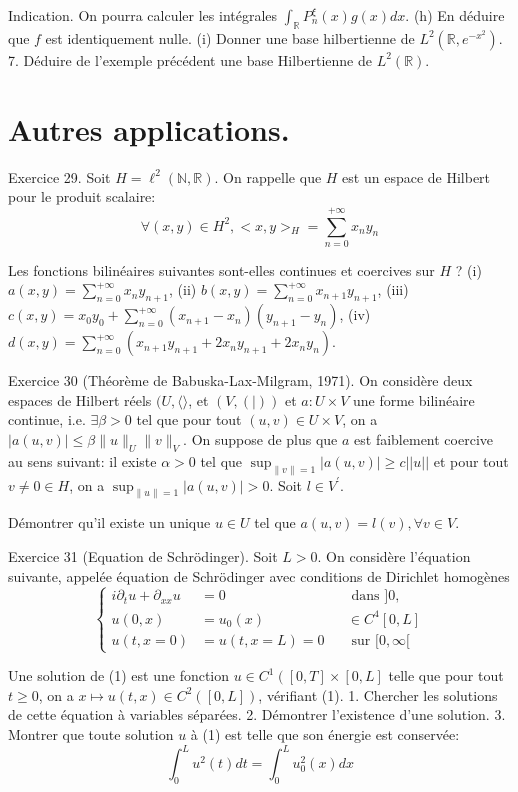 \documentclass[12pt,a4paper]{article}
\begin{document}
Indication. On pourra calculer les intégrales \(\int_{\mathbb{R}} P_{n}^{\xi}(x) g(x) d x\).
(h) En déduire que \(f\) est identiquement nulle.
(i) Donner une base hilbertienne de \(L^{2}\left(\mathbb{R}, e^{-x^{2}}\right)\).
7. Déduire de l'exemple précédent une base Hilbertienne de \(L^{2}(\mathbb{R})\).

\section*{Autres applications.}

Exercice 29. Soit \(H=\ell^{2}(\mathbb{N}, \mathbb{R})\). On rappelle que \(H\) est un espace de Hilbert pour le produit scalaire:
\[
\forall(x, y) \in H^{2},<x, y>_{H}=\sum_{n=0}^{+\infty} x_{n} y_{n}
\]

Les fonctions bilinéaires suivantes sont-elles continues et coercives sur \(H\) ?
(i) \(a(x, y)=\sum_{n=0}^{+\infty} x_{n} y_{n+1}\), (ii) \(b(x, y)=\sum_{n=0}^{+\infty} x_{n+1} y_{n+1}\),
(iii) \(c(x, y)=x_{0} y_{0}+\sum_{n=0}^{+\infty}\left(x_{n+1}-x_{n}\right)\left(y_{n+1}-y_{n}\right)\), (iv) \(d(x, y)=\sum_{n=0}^{+\infty}\left(x_{n+1} y_{n+1}+2 x_{n} y_{n+1}+2 x_{n} y_{n}\right)\).

Exercice 30 (Théorème de Babuska-Lax-Milgram, 1971). On considère deux espaces de Hilbert réels \((U,\langle\rangle\), et \((V,(\mid))\) et \(a: U \times V\) une forme bilinéaire continue, i.e. \(\exists \beta>0\) tel que pour tout \((u, v) \in U \times V\), on a \(|a(u, v)| \leqslant \beta\|u\|_{U}\|v\|_{V}\). On suppose de plus que \(a\) est faiblement coercive au sens suivant: il existe \(\alpha>0\) tel que \(\sup _{\|v\|=1}|a(u, v)| \geqslant c| | u| |\) et pour tout \(v \neq 0 \in H\), on a \(\sup _{\|u\|=1}|a(u, v)|>0\). Soit \(l \in V^{\prime}\).

Démontrer qu'il existe un unique \(u \in U\) tel que \(a(u, v)=l(v), \forall v \in V\).

Exercice 31 (Equation de Schrödinger). Soit \(L>0\). On considère l'équation suivante, appelée équation de Schrödinger avec conditions de Dirichlet homogènes
\[
\left\{\begin{aligned}
i \partial_{t} u+\partial_{x x} u & =0 & & \text { dans }] 0, \\
u(0, x) & =u_{0}(x) & & \in C^{4}[0, L] \\
u(t, x=0) & =u(t, x=L)=0 & & \text { sur }[0, \infty[
\end{aligned}\right.
\]

Une solution de (1) est une fonction \(u \in C^{1}\left([0, T] \times[0, L]\right.\) telle que pour tout \(t \geqslant 0\), on a \(x \mapsto u(t, x) \in C^{2}([0, L])\), vérifiant (1).
1. Chercher les solutions de cette équation à variables séparées.
2. Démontrer l'existence d'une solution.
3. Montrer que toute solution \(u\) à (1) est telle que son énergie est conservée:
\[
\int_{0}^{L} u^{2}(t) d t=\int_{0}^{L} u_{0}^{2}(x) d x
\]
\end{document}
